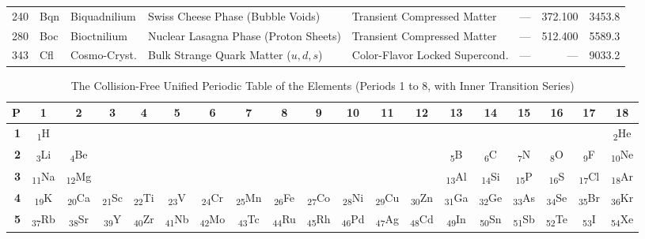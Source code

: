 \documentclass[10pt,twocolumn,a4paper]{article}
\begin{document}
\begin{table}[t]
\begin{tabular}{rllllrrr}
240 & Bqn & Biquadnilium & Swiss Cheese Phase (Bubble Voids)                       & Transient Compressed Matter      & ---    & 372.100 & 3453.8 \\
280 & Boc & Bioctnilium  & Nuclear Lasagna Phase (Proton Sheets)                   & Transient Compressed Matter      & ---    & 512.400 & 5589.3 \\
343 & Cfl & Cosmo-Cryst. & Bulk Strange Quark Matter ($u,d,s$)                     & Color-Flavor Locked Supercond.   & ---    & ---     & 9033.2 \\
\bottomrule
\end{tabular}
\end{table}

\begin{table}[t]
\centering
\scriptsize
\setlength{\tabcolsep}{1.6pt}
\caption{The Collision-Free Unified Periodic Table of the Elements (Periods 1 to 8, with Inner Transition Series)}
\label{tab:unified_periodic_table}
\begin{tabular}{rcccccccccccccccccc}
\toprule
\textbf{P} & \textbf{1} & \textbf{2} & \textbf{3} & \textbf{4} & \textbf{5} & \textbf{6} & \textbf{7} & \textbf{8} & \textbf{9} & \textbf{10} & \textbf{11} & \textbf{12} & \textbf{13} & \textbf{14} & \textbf{15} & \textbf{16} & \textbf{17} & \textbf{18} \\
\midrule
\textbf{1} & \textsubscript{1}H & & & & & & & & & & & & & & & & & \textsubscript{2}He \\
\textbf{2} & \textsubscript{3}Li & \textsubscript{4}Be & & & & & & & & & & & \textsubscript{5}B & \textsubscript{6}C & \textsubscript{7}N & \textsubscript{8}O & \textsubscript{9}F & \textsubscript{10}Ne \\
\textbf{3} & \textsubscript{11}Na & \textsubscript{12}Mg & & & & & & & & & & & \textsubscript{13}Al & \textsubscript{14}Si & \textsubscript{15}P & \textsubscript{16}S & \textsubscript{17}Cl & \textsubscript{18}Ar \\
\textbf{4} & \textsubscript{19}K & \textsubscript{20}Ca & \textsubscript{21}Sc & \textsubscript{22}Ti & \textsubscript{23}V & \textsubscript{24}Cr & \textsubscript{25}Mn & \textsubscript{26}Fe & \textsubscript{27}Co & \textsubscript{28}Ni & \textsubscript{29}Cu & \textsubscript{30}Zn & \textsubscript{31}Ga & \textsubscript{32}Ge & \textsubscript{33}As & \textsubscript{34}Se & \textsubscript{35}Br & \textsubscript{36}Kr \\
\textbf{5} & \textsubscript{37}Rb & \textsubscript{38}Sr & \textsubscript{39}Y & \textsubscript{40}Zr & \textsubscript{41}Nb & \textsubscript{42}Mo & \textsubscript{43}Tc & \textsubscript{44}Ru & \textsubscript{45}Rh & \textsubscript{46}Pd & \textsubscript{47}Ag & \textsubscript{48}Cd & \textsubscript{49}In & \textsubscript{50}Sn & \textsubscript{51}Sb & \textsubscript{52}Te & \textsubscript{53}I & \textsubscript{54}Xe \\

\end{tabular}
\end{table}
\end{document}
